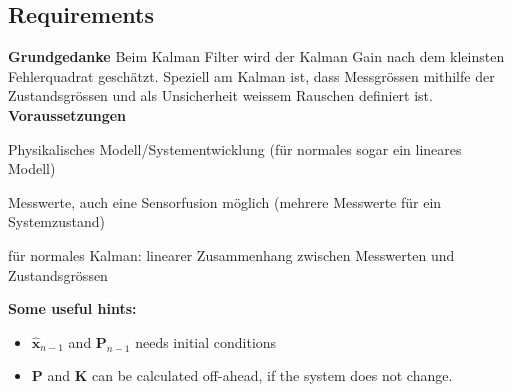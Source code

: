 \subsection{Requirements}
\textbf{Grundgedanke} Beim Kalman Filter wird der Kalman Gain nach dem
kleinsten Fehlerquadrat geschätzt. Speziell am Kalman ist, dass Messgrössen
mithilfe der Zustandsgrössen und als Unsicherheit weissem Rauschen definiert ist. \\
\textbf{Voraussetzungen}
\begin{aufzaehlung}
   	\item Physikalisches Modell/Systementwicklung (für normales sogar ein
   	lineares Modell)
   	\item Messwerte, auch eine Sensorfusion möglich (mehrere Messwerte für ein
   	Systemzustand)
   	\item für normales Kalman: linearer Zusammenhang zwischen Messwerten und
   	Zustandsgrössen
\end{aufzaehlung}

\textbf{Some useful hints:}
\begin{itemize}
	\item $\bm{\hat{x}}_{n-1}$ and $\bm{P}_{n-1}$ needs initial conditions
	\item $\bm{P}$ and $\bm{K}$ can be calculated off-ahead, if the system does not change.
\end{itemize}

